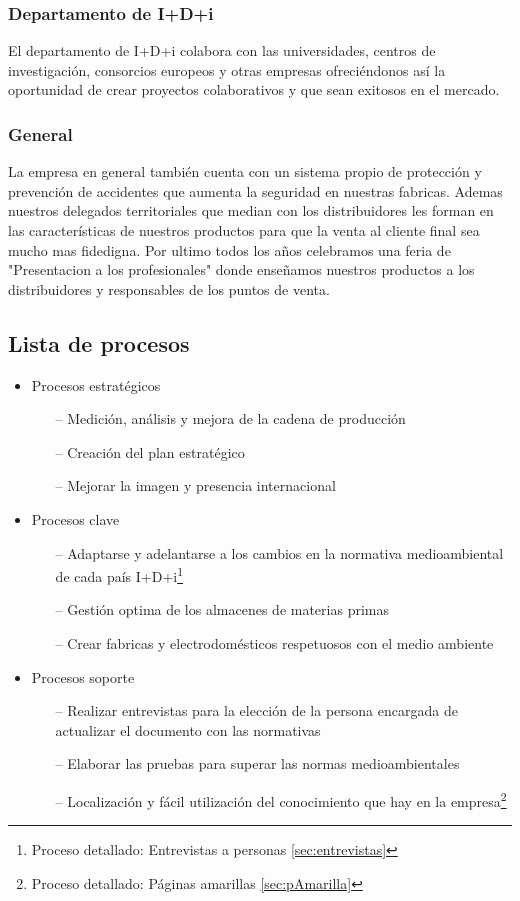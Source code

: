 \documentclass[a4paper]{article}
\begin{document}
\subsubsection{Departamento de I+D+i}
El departamento de I+D+i colabora con las universidades, centros de investigación, consorcios europeos y otras empresas ofreciéndonos así la oportunidad de crear proyectos colaborativos y que sean exitosos en el mercado.

\subsubsection{General}
La empresa en general también cuenta con un sistema propio de protección y prevención de accidentes que aumenta la seguridad en nuestras fabricas. Ademas nuestros delegados territoriales que median con los distribuidores les forman en las características de nuestros productos para que la venta al cliente final sea mucho mas fidedigna. Por ultimo todos los años celebramos una feria de "Presentacion a los profesionales" donde enseñamos nuestros productos a los distribuidores y responsables de los puntos de venta.

\subsection{Lista de procesos}

\begin{itemize}
	\item Procesos estratégicos
	\begin{itemize}
		\item[--] Medición, análisis y mejora de la cadena de producción
		\item[--] Creación del plan estratégico
		\item[--] Mejorar la imagen y presencia internacional
	\end{itemize}
	\item Procesos clave
	\begin{itemize}
		\item[--] Adaptarse y adelantarse a los cambios en la normativa medioambiental de cada país I+D+i\footnote{Proceso detallado: Entrevistas a personas \ref{sec:entrevistas}}
		\item[--] Gestión optima de los almacenes de materias primas
		\item[--] Crear fabricas y electrodomésticos respetuosos con el medio ambiente
	\end{itemize}
	\item Procesos soporte
	\begin{itemize}
		\item[--] Realizar entrevistas para la elección de la persona encargada de actualizar el documento con las normativas
		\item[--] Elaborar las pruebas para superar las normas medioambientales
		\item[--] Localización y fácil utilización del conocimiento que hay en la empresa\footnote{Proceso detallado: Páginas amarillas \ref{sec:pAmarilla}}
	\end{itemize}
\end{itemize}
\end{document}
